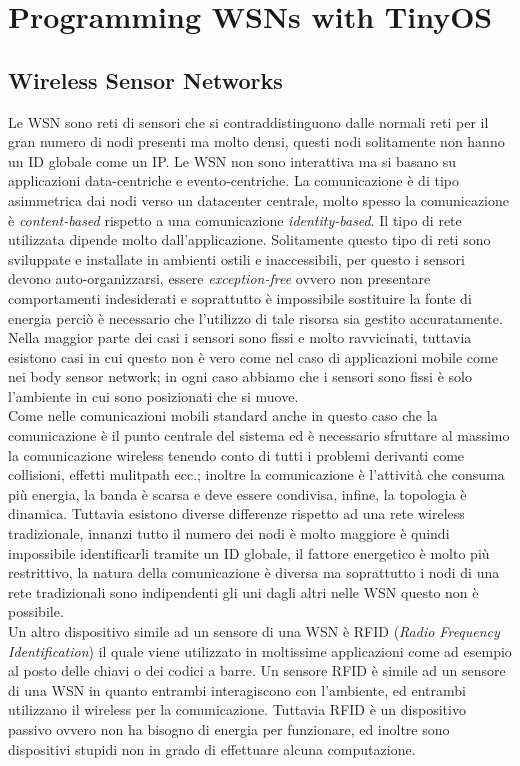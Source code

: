 \section{Programming WSNs with TinyOS}\label{capitolo8}
\subsection{Wireless Sensor Networks}
Le WSN sono reti di sensori che si contraddistinguono dalle normali reti per il gran numero di nodi presenti ma molto densi, questi nodi solitamente non hanno un ID globale come un IP. Le WSN non sono interattiva ma si basano su applicazioni data-centriche e evento-centriche. La comunicazione è di tipo asimmetrica dai nodi verso un datacenter centrale, molto spesso la comunicazione è \emph{content-based} rispetto a una comunicazione \emph{identity-based}. Il tipo di rete utilizzata dipende molto dall'applicazione. Solitamente questo tipo di reti sono sviluppate e installate in ambienti ostili e inaccessibili, per questo i sensori devono auto-organizzarsi, essere \emph{exception-free} ovvero non presentare comportamenti indesiderati e soprattutto è impossibile sostituire la fonte di energia perciò è necessario che l'utilizzo di tale risorsa sia gestito accuratamente.\\
Nella maggior parte dei casi i sensori sono fissi e molto ravvicinati, tuttavia esistono casi in cui questo non è vero come nel caso di applicazioni mobile come nei body sensor network; in ogni caso abbiamo che i sensori sono fissi è solo l'ambiente in cui sono posizionati che si muove.\\
Come nelle comunicazioni mobili standard anche in questo caso che la comunicazione è il punto centrale del sistema ed è necessario sfruttare al massimo la comunicazione wireless tenendo conto di tutti i problemi derivanti come collisioni, effetti mulitpath ecc.; inoltre la comunicazione è l'attività che consuma più energia, la banda è scarsa e deve essere condivisa, infine, la topologia è dinamica. Tuttavia esistono diverse differenze rispetto ad una rete wireless tradizionale, innanzi tutto il numero dei nodi è molto maggiore è quindi impossibile identificarli tramite un ID globale, il fattore energetico è molto più restrittivo, la natura della comunicazione è diversa ma soprattutto i nodi di una rete tradizionali sono indipendenti gli uni dagli altri nelle WSN questo non è possibile.\\
Un altro dispositivo simile ad un sensore di una WSN è RFID (\emph{Radio Frequency Identification}) il quale viene utilizzato in moltissime applicazioni come ad esempio al posto delle chiavi o dei codici a barre. Un sensore RFID è simile ad un sensore di una WSN in quanto entrambi interagiscono con l'ambiente, ed entrambi utilizzano il wireless per la comunicazione. Tuttavia RFID è un dispositivo passivo ovvero non ha bisogno di energia per funzionare, ed inoltre sono dispositivi stupidi non in grado di effettuare alcuna computazione.\\
